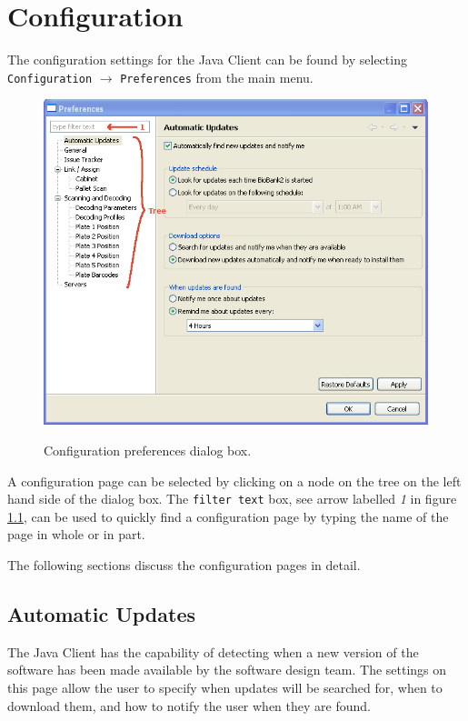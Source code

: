 \chapter{Configuration}
\label{chap:configuration}
The configuration settings for the Java Client can be found by selecting
\texttt{Configuration} $\to$ \texttt{Preferences} from the main menu.
    \begin{figure}[H]
      \centering
      \scalebox{0.5}
      { \includegraphics*{screenshots/configuration/preferences_dialog} }
      \caption{Configuration preferences dialog box.}
      \label{fig:preferences_dialog}
    \end{figure}
A configuration page can be selected by clicking on a node on the
tree on the left hand side of the dialog box. The \texttt{filter text} box, see
arrow labelled \emph{1} in figure \ref{fig:preferences_dialog}, can
be used to quickly find a configuration page by typing the name of the page in
whole or in part.

The following sections discuss the configuration pages in detail.

\section{Automatic Updates}
\label{sec:automatic_updates}
The Java Client has the capability of detecting when a new version of the
software has been made available by the software design team. The settings on
this page allow the user to specify when updates will be searched for, when to
download them, and how to notify the user when they are found.


